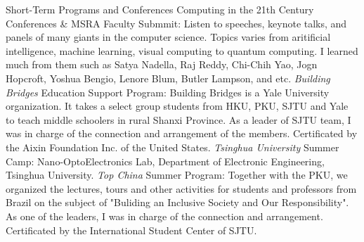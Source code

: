 

\begin{rubric}{Short-Term Programs and Conferences}
		Computing in the 21th Century Conferences \& MSRA Faculty Submmit: Listen to speeches, keynote talks, and panels of many giants in the computer science. Topics varies from aritificial intelligence, machine learning, visual computing to quantum computing. I learned much from them such as Satya Nadella, Raj Reddy, Chi-Chih Yao, Jogn Hopcroft, Yoshua Bengio, Lenore Blum, Butler Lampson, and etc.
		\hfill{}
        \emph{Building Bridges} Education Support Program: Building Bridges is a Yale University organization. It takes a select group students from HKU, PKU, SJTU and Yale to teach middle schoolers in rural Shanxi Province. As a leader of SJTU team, I was in charge of the connection and arrangement of the members. Certificated by the Aixin Foundation Inc. of the United States. 
        \hfill{}
    	\emph{Tsinghua University} Summer Camp: Nano-OptoElectronics Lab, Department of Electronic Engineering, Tsinghua University.
    	\hfill{}
		\emph{Top China} Summer Program: Together with the PKU, we organized the lectures, tours and other activities for students and professors from Brazil on the subject of "Buliding an Inclusive Society and Our Responsibility". As one of the leaders, I was in charge of the connection and arrangement. Certificated by the International Student Center of SJTU.
		\hfill{}


		
\end{rubric}
